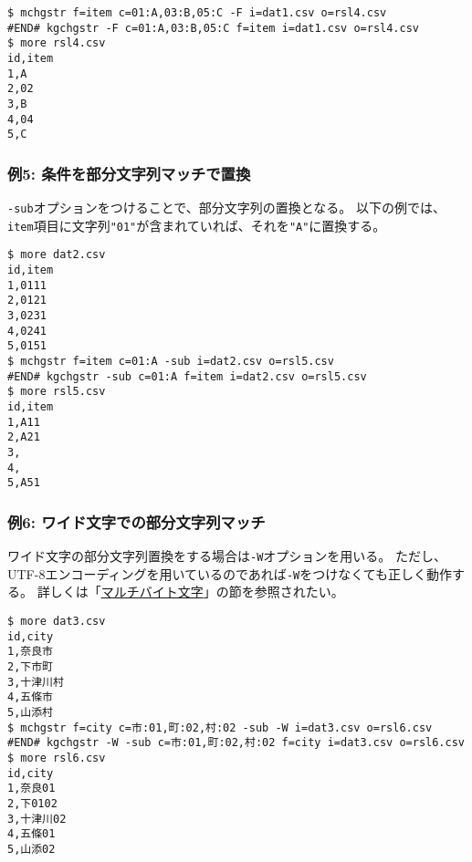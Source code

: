 \begin{Verbatim}[baselinestretch=0.7,frame=single]
$ mchgstr f=item c=01:A,03:B,05:C -F i=dat1.csv o=rsl4.csv
#END# kgchgstr -F c=01:A,03:B,05:C f=item i=dat1.csv o=rsl4.csv
$ more rsl4.csv
id,item
1,A
2,02
3,B
4,04
5,C
\end{Verbatim}
\subsubsection*{例5: 条件を部分文字列マッチで置換}

\verb|-sub|オプションをつけることで、部分文字列の置換となる。
以下の例では、\verb|item|項目に文字列\verb|"01"|が含まれていれば、それを\verb|"A"|に置換する。


\begin{Verbatim}[baselinestretch=0.7,frame=single]
$ more dat2.csv
id,item
1,0111
2,0121
3,0231
4,0241
5,0151
$ mchgstr f=item c=01:A -sub i=dat2.csv o=rsl5.csv
#END# kgchgstr -sub c=01:A f=item i=dat2.csv o=rsl5.csv
$ more rsl5.csv
id,item
1,A11
2,A21
3,
4,
5,A51
\end{Verbatim}
\subsubsection*{例6: ワイド文字での部分文字列マッチ}

ワイド文字の部分文字列置換をする場合は\verb|-W|オプションを用いる。
ただし、UTF-8エンコーディングを用いているのであれば\verb|-W|をつけなくても正しく動作する。
詳しくは「\hyperref[sect:multibyte]{マルチバイト文字}」の節を参照されたい。


\begin{Verbatim}[baselinestretch=0.7,frame=single]
$ more dat3.csv
id,city
1,奈良市
2,下市町
3,十津川村
4,五條市
5,山添村
$ mchgstr f=city c=市:01,町:02,村:02 -sub -W i=dat3.csv o=rsl6.csv
#END# kgchgstr -W -sub c=市:01,町:02,村:02 f=city i=dat3.csv o=rsl6.csv
$ more rsl6.csv
id,city
1,奈良01
2,下0102
3,十津川02
4,五條01
5,山添02
\end{Verbatim}
